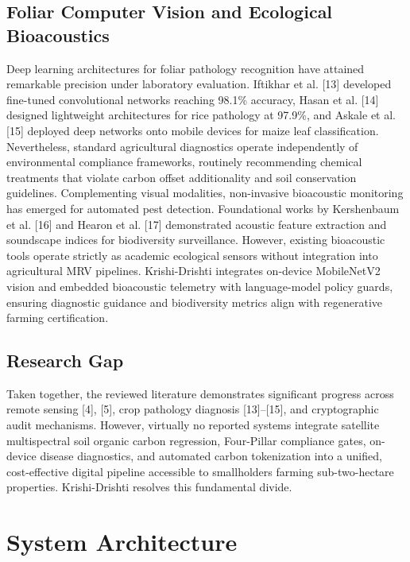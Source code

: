 \documentclass[10pt,a4paper,twocolumn]{IEEEtran}
\begin{document}
\subsection{Foliar Computer Vision and Ecological Bioacoustics}
Deep learning architectures for foliar pathology recognition have attained remarkable precision under laboratory evaluation. Iftikhar et al. [13] developed fine-tuned convolutional networks reaching 98.1\% accuracy, Hasan et al. [14] designed lightweight architectures for rice pathology at 97.9\%, and Askale et al. [15] deployed deep networks onto mobile devices for maize leaf classification. Nevertheless, standard agricultural diagnostics operate independently of environmental compliance frameworks, routinely recommending chemical treatments that violate carbon offset additionality and soil conservation guidelines. Complementing visual modalities, non-invasive bioacoustic monitoring has emerged for automated pest detection. Foundational works by Kershenbaum et al. [16] and Hearon et al. [17] demonstrated acoustic feature extraction and soundscape indices for biodiversity surveillance. However, existing bioacoustic tools operate strictly as academic ecological sensors without integration into agricultural MRV pipelines. Krishi-Drishti integrates on-device MobileNetV2 vision and embedded bioacoustic telemetry with language-model policy guards, ensuring diagnostic guidance and biodiversity metrics align with regenerative farming certification.

\subsection{Research Gap}
Taken together, the reviewed literature demonstrates significant progress across remote sensing [4], [5], crop pathology diagnosis [13]--[15], and cryptographic audit mechanisms. However, virtually no reported systems integrate satellite multispectral soil organic carbon regression, Four-Pillar compliance gates, on-device disease diagnostics, and automated carbon tokenization into a unified, cost-effective digital pipeline accessible to smallholders farming sub-two-hectare properties. Krishi-Drishti resolves this fundamental divide.

\section{System Architecture}
\end{document}
